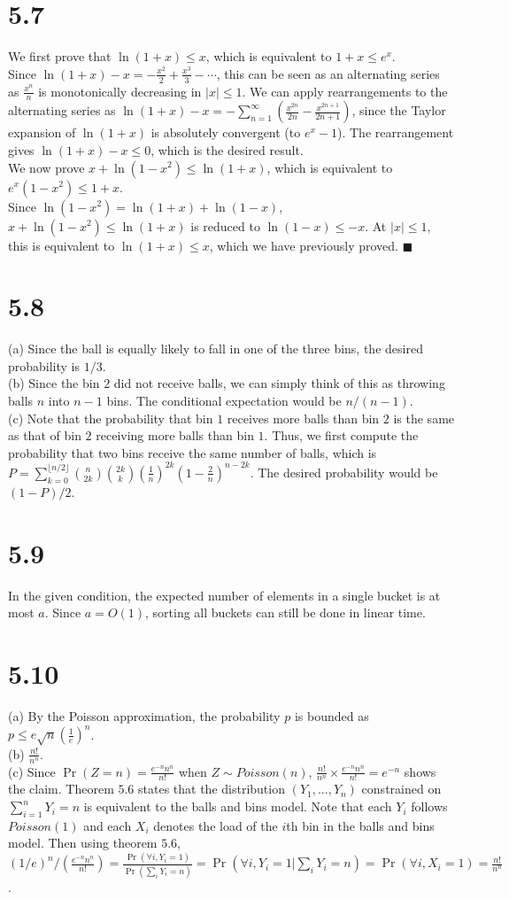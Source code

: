 \documentclass{article}
\begin{document}
\section*{5.7}
We first prove that $\ln(1+x)\leq x$, which is equivalent to $1+x\leq e^x$.\\
Since $\ln(1+x)-x= -\frac{x^2}{2}+\frac{x^3}{3}-\cdots$, this can be seen as an alternating series as $\frac{x^n}{n}$ is monotonically decreasing in $|x| \leq 1$.
We can apply rearrangements to the alternating series as $\ln(1+x)-x=-\sum\limits_{n=1}^\infty\left(\frac{x^{2n}}{2n}-\frac{x^{2n+1}}{2n+1}\right)$,
since the Taylor expansion of $\ln(1+x)$ is absolutely convergent (to $e^x-1$).
The rearrangement gives $\ln(1+x)-x \leq 0$, which is the desired result.\\
We now prove $x + \ln(1-x^2) \leq \ln(1+x)$, which is equivalent to $e^x(1-x^2) \leq 1+x$.\\
Since $\ln(1-x^2)=\ln(1+x)+\ln(1-x)$, $x + \ln(1-x^2) \leq \ln(1+x)$ is reduced to $\ln(1-x)\leq -x$. 
At $|x|\leq 1$, this is equivalent to $\ln(1+x)\leq x$, which we have previously proved. $\blacksquare$
\section*{5.8}
(a) Since the ball is equally likely to fall in one of the three bins, the desired probability is $1/3$.\\
(b) Since the bin $2$ did not receive balls, we can simply think of this as throwing balls $n$ into $n-1$ bins. The conditional expectation would be $n/(n-1)$.\\
(c) Note that the probability that bin $1$ receives more balls than bin $2$ is the same as that of bin $2$ receiving more balls than bin $1$. Thus, we first compute the probability that two bins receive the same number of balls, which is\\
$P=\sum\limits_{k=0}^{\lfloor n/2\rfloor}\binom{n}{2k}\binom{2k}{k}(\frac{1}{n})^{2k}(1-\frac{2}{n})^{n-2k}$.
The desired probability would be $(1-P)/2$.
\section*{5.9}
In the given condition, the expected number of elements in a single bucket is at most $a$. Since $a=O(1)$, sorting all buckets can still be done in linear time.
\section*{5.10}
(a) By the Poisson approximation, the probability $p$ is bounded as $p \leq e\sqrt{n}(\frac{1}{e})^n$.\\
(b) $\frac{n!}{n^n}$.\\
(c) Since $\Pr(Z=n)=\frac{e^{-n}n^n}{n!}$ when $Z\sim Poisson(n)$, $\frac{n!}{n^n}\times\frac{e^{-n}n^n}{n!}=e^{-n}$ shows the claim.
Theorem $5.6$ states that the distribution $(Y_1,...,Y_n)$ constrained on $\sum\limits_{i=1}^n Y_i=n$ is equivalent to the balls and bins model.
Note that each $Y_i$ follows $Poisson(1)$ and each $X_i$ denotes the load of the $i$th bin in the balls and bins model.
Then using theorem $5.6$, $(1/e)^n/(\frac{e^{-n}n^n}{n!})=\frac{\Pr(\forall i, Y_i=1)}{\Pr(\sum_iY_i=n)}=\Pr(\forall i,Y_i=1 | \sum_i Y_i=n)=\Pr(\forall i, X_i=1)=\frac{n!}{n^n}$.
\end{document}
